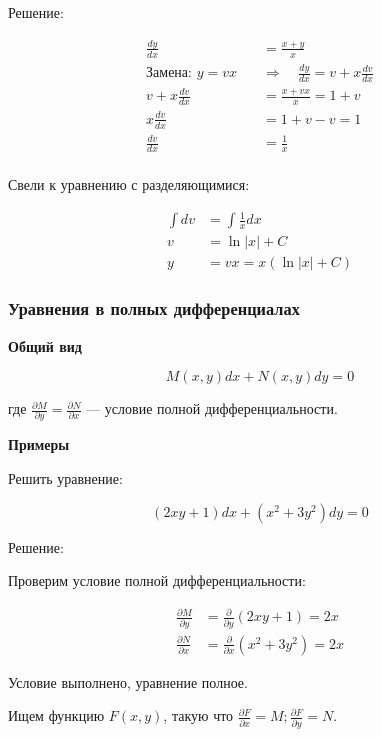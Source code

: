 Решение:

\begin{align*}
    \frac{dy}{dx} &= \frac{x + y}{x} \\
    \text{Замена: } y = vx \quad &\Rightarrow \quad \frac{dy}{dx} = v + x\frac{dv}{dx} \\
    v + x \frac{dv}{dx} &= \frac{x + vx}{x} = 1 + v \\
    x \frac{dv}{dx} &= 1 + v - v = 1 \\
    \frac{dv}{dx} &= \frac{1}{x} \\
\end{align*}

Свели к уравнению с разделяющимися:

\begin{align*}
    \int dv &= \int \frac{1}{x} dx \\
    v &= \ln|x| + C \\
    y &= vx = x(\ln|x| + C)
\end{align*}

\subsubsection{Уравнения в полных дифференциалах}

\textbf{Общий вид}

\begin{equation*}
    M(x,y)dx + N(x,y)dy = 0
\end{equation*}

где \(\frac{\partial M}{\partial y} = \frac{\partial N}{\partial x}\) — условие полной дифференциальности.

\textbf{Примеры}

Решить уравнение:

\begin{equation*}
(2xy + 1)dx + (x^2 + 3y^2)dy = 0
\end{equation*}

Решение:

Проверим условие полной дифференциальности:

\begin{align*}
    \frac{\partial M}{\partial y} &= \frac{\partial}{\partial y}(2xy + 1) = 2x \\
    \frac{\partial N}{\partial x} &= \frac{\partial}{\partial x}(x^2 + 3y^2) = 2x
\end{align*}

Условие выполнено, уравнение полное.

Ищем функцию $F(x,y)$, такую что $\frac{\partial F}{\partial x} = M; \frac{\partial F}{\partial y} = N$.

